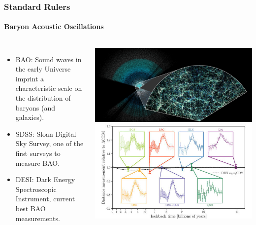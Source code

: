 \documentclass[aspectratio=169]{beamer}
\begin{document}
\begin{frame}
    \frametitle{Standard Rulers}
    \framesubtitle{Baryon Acoustic Oscillations}
    \begin{columns}
        \begin{itemize}
            \item BAO: Sound waves in the early Universe imprint a characteristic scale on the distribution of baryons (and galaxies). \hfill {}
            \item SDSS: Sloan Digital Sky Survey, one of the first surveys to measure BAO. \hfill {}
            \item DESI: Dark Energy Spectroscopic Instrument, current best BAO measurements. \hfill {}
        \end{itemize}
        \includegraphics[width=\textwidth]{figures/desi_galaxies.png}
        \includegraphics[width=\textwidth]{figures/desi_bao.jpg}%
    \end{columns}
\end{frame}
\end{document}
